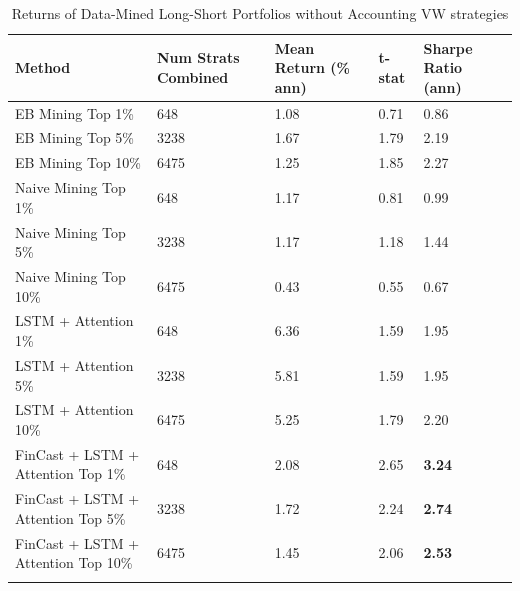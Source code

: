 \documentclass[pdflatex,sn-mathphys-num]{sn-jnl}%
\theoremstyle{thmstyleone}%
\theoremstyle{thmstyletwo}%
\theoremstyle{thmstylethree}%
\begin{document}
\begin{table}[h]
\caption{Returns of Data-Mined Long-Short Portfolios without Accounting VW strategies}\label{tab2}%
\begin{tabular}{@{}lllll@{}}
\toprule
Method & Num Strats Combined & Mean Return (\% ann)  & t-stat & Sharpe Ratio (ann) \\
\midrule
EB Mining Top 1\%    & 648 & 1.08  & 0.71 & 0.86  \\
EB Mining Top 5\%    &  3238   & 1.67  & 1.79   & 2.19  \\
EB Mining Top 10\%    & 6475   & 1.25  & 1.85 & 2.27  \\
Naive Mining Top 1\%    & 648   & 1.17  & 0.81 & 0.99    \\
Naive Mining Top 5\%    & 3238   & 1.17  & 1.18  &  1.44   \\
Naive Mining Top 10\%    & 6475   & 0.43  &  0.55 &  0.67  \\
LSTM + Attention 1\%    & 648   & 6.36  &  1.59 &  1.95   \\
LSTM + Attention 5\%    & 3238   & 5.81 &  1.59 &  1.95   \\
LSTM + Attention 10\%    & 6475   & 5.25  &  1.79 &  2.20   \\
FinCast + LSTM + Attention Top 1\%    & 648   & 2.08  & 2.65  &   \textbf{3.24}  \\
FinCast + LSTM + Attention Top 5\%    & 3238   & 1.72    &  2.24 & \textbf{2.74}  \\
FinCast + LSTM + Attention Top 10\%    & 6475   & 1.45  &  2.06  &  \textbf{2.53}  \\

\botrule
\end{tabular}


\end{table}
\end{document}
